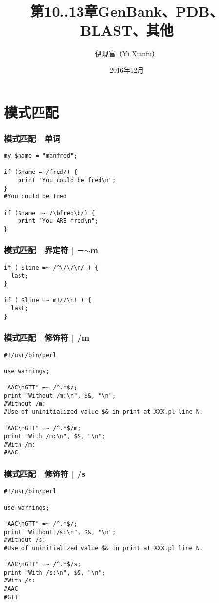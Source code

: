


\title[其他]{第10..13章\quad GenBank、PDB、BLAST、其他}
\author[Yixf]{伊现富（Yi Xianfu）}
\date{2016年12月}




\section{模式匹配}
\begin{frame}[fragile]
  \frametitle{模式匹配 | 单词}
\begin{lstlisting}
my $name = "manfred";

if ($name =~/fred/) {
    print "You could be fred\n";
}
#You could be fred

if ($name =~ /\bfred\b/) {
    print "You ARE fred\n";
}
\end{lstlisting}
\end{frame}

\begin{frame}[fragile]
  \frametitle{模式匹配 | 界定符 | =$\sim$m}
\begin{lstlisting}
if ( $line =~ /^\/\/\n/ ) {
  last;
}

if ( $line =~ m!//\n! ) {
  last;
}
\end{lstlisting}
\end{frame}

\begin{frame}[fragile]
  \frametitle{模式匹配 | 修饰符 | /m}
\begin{lstlisting}
#!/usr/bin/perl

use warnings;

"AAC\nGTT" =~ /^.*$/;
print "Without /m:\n", $&, "\n";
#Without /m:
#Use of uninitialized value $& in print at XXX.pl line N.

"AAC\nGTT" =~ /^.*$/m;
print "With /m:\n", $&, "\n";
#With /m:
#AAC
\end{lstlisting}
\end{frame}

\begin{frame}[fragile]
  \frametitle{模式匹配 | 修饰符 | /s}
\begin{lstlisting}
#!/usr/bin/perl

use warnings;

"AAC\nGTT" =~ /^.*$/;
print "Without /s:\n", $&, "\n";
#Without /s:
#Use of uninitialized value $& in print at XXX.pl line N.

"AAC\nGTT" =~ /^.*$/s;
print "With /s:\n", $&, "\n";
#With /s:
#AAC
#GTT
\end{lstlisting}
\end{frame}

